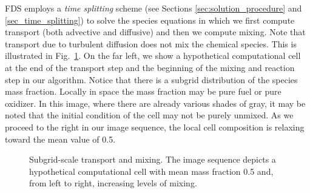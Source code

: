 FDS employs a \emph{time splitting} scheme (see Sections \ref{sec:solution_procedure} and \ref{sec_time_splitting}) to solve the species equations in which we first compute transport (both advective and diffusive) and then we compute mixing.  Note that transport due to turbulent diffusion does not mix the chemical species.  This is illustrated in Fig.~\ref{fig_transport_vs_mixing}.  On the far left, we show a hypothetical computational cell at the end of the transport step and the beginning of the mixing and reaction step in our algorithm.  Notice that there is a subgrid distribution of the species mass fraction.  Locally in space the mass fraction may be pure fuel or pure oxidizer.  In this image, where there are already various shades of gray, it may be noted that  the initial condition of the cell may not be purely unmixed.  As we proceed to the right in our image sequence, the local cell composition is relaxing toward the mean value of 0.5.

\begin{figure}[h]
\begin{center}
\end{center}
\caption{Subgrid-scale transport and mixing. The image sequence depicts a hypothetical computational cell with mean mass fraction 0.5 and, from left to right, increasing levels of mixing.}
\label{fig_transport_vs_mixing}
\end{figure}


